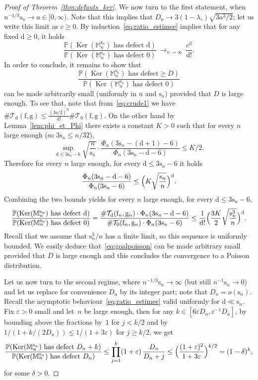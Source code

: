 \documentclass[10pt]{amsart}
\theoremstyle{plain}
\theoremstyle{definition}
\theoremstyle{remark}
\renewcommand{\P}{\mathbb{P}}
\newcommand{\Mapb}{\mathbb{M}}
\newcommand{\face}{\mathrm{f}}
\newcommand{\defect}{\mathrm{d}}
\newcommand{\gen}{\mathrm{g}}
\newcommand{\spar}{\mathrm{s}}
\DeclareMathOperator{\Ker}{Ker}
\newcommand{\cv}[1][n]{\,\mathop{\longrightarrow}^{}_{#1 \to \infty}\,}
\begin{document}
\begin{proof}[Proof of Theorem~\ref{thm:defauts_ker}]
We now turn to the first statement, when $n^{-1/3} \spar_n \to a \in [0,\infty)$. Note that this implies that $D_n \to 3 (1-\lambda_{\circ}) \sqrt{3 a^3 / 2}$; let us write this limit as $c \ge 0$.
By induction~\eqref{eq:ratio_estimee} implies that for any fixed $\defect\ge0$, it holds
\[
\frac{\P(\Ker(\Mapb_n^{\spar_n}) \textrm{ has defect } \defect)}{\P(\Ker(\Mapb_n^{\spar_n}) \textrm{ has defect } 0)}
\cv \frac{c^\defect}{\defect!}.
\]
In order to conclude, it remains to show that
\begin{equation}\label{eq:goalpoisson}
\frac{\P(\Ker(\Mapb_n^{\spar_n}) \textrm{ has defect} \geq D)}{\P(\Ker(\Mapb_n^{\spar_n}) \textrm{ has defect } 0)}
\end{equation}
can be made arbitrarily small (uniformly in $n$ and $\mathrm{s}_{n}$) provided that $D$ is large enough. To see that, note that from~\eqref{eq:crude1} we have $\# \mathcal{T}_{\defect}(\face,\gen) \le \frac{(3\spar/2)^\defect}{\defect!} \# \mathcal{T}_{0}(\face,\gen)$.
On the other hand by Lemma~\ref{lem:phi_et_Phi} there exists a constant $K>0$ such that for every $n$ large enough (so \eg $3\spar_n \le n/32$),
\[
\sup_{\defect \le 3\spar_n-6} \sqrt{\frac{n}{\spar_n}} \cdot \frac{\Phi_{n}(3\spar_n-(\defect+1)-6 )}{\Phi_{n}(3\spar_n-\defect-6 )}
\le K/2.
\]
Therefore for every $n$ large enough, for every $\defect \le 3\spar_n-6$ it holds
\[
\frac{\Phi_{n}(3\spar_n-\defect-6 )}{\Phi_{n}(3\spar_n-6 )} \le \Bigl(K \sqrt{\frac{\spar_n}{n}}\Bigr)^\defect.
\]
Combining the two bounds yields for every $n$ large enough, for every $\defect \le 3\spar_n-6$,
\[
\frac{\P(\Ker(\Mapb_n^{\spar_n}) \textrm{ has defect } \defect)}{\P(\Ker(\Mapb_n^{\spar_n}) \textrm{ has defect } 0)}
= \frac{\#\mathcal{T}_\defect(\face_n,\gen_n) \cdot \Phi_{n}(3\spar_n-\defect-6)}{\# \mathcal{T}_0(\face_n,\gen_n) \cdot \Phi_{n}(3\spar_n-6 )}
\le \frac{1}{\defect!} \Bigl(\frac{3K}{2} \sqrt{\frac{\spar_n^3}{n}}\Bigr)^\defect.
\]
Recall that we assume that $\spar_n^3/n$ has a finite limit, so this sequence is uniformly bounded. We easily deduce that~\eqref{eq:goalpoisson} can be made arbitrary small provided that $D$ is large enough and this concludes the convergence to a Poisson distribution.

Let us now turn to the second regime, where $n^{-1/3} \spar_n \to \infty$ (but still $n^{-1} \spar_n \to 0$) and let us replace for convenience $D_n$ by its integer part; note that $D_n = o(\spar_n)$.
Recall the asymptotic behaviour~\eqref{eq:ratio_estimee} valid uniformly for $\defect \ll \spar_n$.
Fix $\varepsilon > 0$ small and let~$n$ be large enough, then for any $k \in [6\varepsilon D_n, \varepsilon^{-1} D_n]$, by bounding above the fractions by~$1$ for $j<k/2$ and by $1/(1+k/(2D_n)) \le 1/(1+3\varepsilon)$ for $j \ge k/2$, we get
\[
\frac{\P(\Ker(\Mapb_n^{\spar_n}) \textrm{ has defect } D_n+k)}{\P(\Ker(\Mapb_n^{\spar_n}) \textrm{ has defect } D_n)}
\le \prod_{j=1}^k (1+\varepsilon)\, \frac{D_n}{D_n+j}
\le \Bigl(\frac{(1+\varepsilon)^2}{1+3\varepsilon}\Bigr)^{k/2}
= (1-\delta)^{k},
\]
for some $\delta >0$.


\end{proof}
\end{document}
